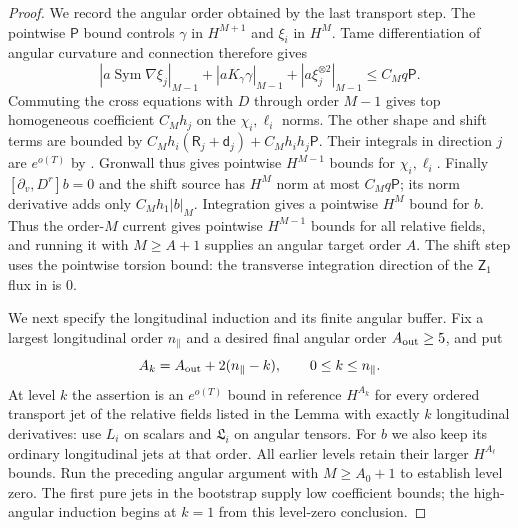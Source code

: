 \begin{proof}
We record the angular order obtained by the last transport step.
The pointwise $\mathsf P$ bound controls $\gamma$ in $H^{M+1}$ and
$\xi_i$ in $H^M$.  Tame differentiation of angular curvature and
connection therefore gives
\[
 |a\operatorname{Sym}\nabla\xi_j|_{M-1}
       +|aK_\gamma\gamma|_{M-1}+|a\xi_j^{\otimes2}|_{M-1}
 \le C_M q\mathsf P.
\]
Commuting the cross equations with $D$ through order $M-1$ gives
top homogeneous coefficient $C_Mh_j$ on the $\chi_i,\ell_i$ norms.
The other shape and shift terms are bounded by
$C_Mh_i(\mathsf R_j+\mathsf d_j)+C_Mh_ih_j\mathsf P$.
Their integrals in direction $j$ are $e^{o(T)}$ by
.  Gronwall thus gives
pointwise $H^{M-1}$ bounds for $\chi_i,\ell_i$.  Finally
$[\partial_v,D^r]b=0$ and the shift source has $H^M$ norm at most
$C_Mq\mathsf P$; its norm derivative adds only $C_Mh_1|b|_M$.
Integration gives a pointwise $H^M$ bound for $b$.
Thus the order-$M$ current gives pointwise $H^{M-1}$ bounds for all
relative fields, and running it with $M\ge A+1$ supplies an angular
target order $A$.  The shift step uses the pointwise torsion bound:
the transverse integration direction of the $\mathsf Z_1$ flux in
 is $0$.

We next specify the longitudinal induction and its finite angular
buffer.  Fix a largest longitudinal order $n_{\parallel}$ and a
desired final angular order $A_{\rm out}\ge5$, and put
\[
 A_k=A_{\rm out}+2(n_{\parallel}-k),
                    \qquad 0\le k\le n_{\parallel}.
\]
At level $k$ the assertion is an $e^{o(T)}$ bound in reference
$H^{A_k}$ for every ordered transport jet of the relative fields
listed in the Lemma with exactly $k$ longitudinal derivatives: use
$L_i$ on scalars and $\mathfrak L_i$ on angular tensors.  For $b$ we
also keep its ordinary longitudinal
jets at that order.  All earlier levels retain their larger
$H^{A_\ell}$ bounds.  Run the preceding angular argument with
$M\ge A_0+1$ to establish level zero.  The first pure jets in the
bootstrap supply low coefficient bounds; the high-angular induction
begins at $k=1$ from this level-zero conclusion.


\end{proof}
